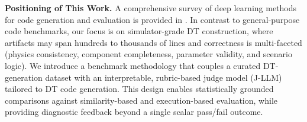 \noindent\textbf{Positioning of This Work.}
A comprehensive survey of deep learning methods for code generation and evaluation is provided in \cite{wu2022surveydeeplearningmodelscodes}.
In contrast to general-purpose code benchmarks, our focus is on simulator-grade DT construction, where artifacts may span hundreds to thousands of lines and correctness is multi-faceted (physics consistency, component completeness, parameter validity, and scenario logic).
We introduce a benchmark methodology that couples a curated DT-generation dataset with an interpretable, rubric-based judge model (J-LLM) tailored to DT code generation.
This design enables statistically grounded comparisons against similarity-based and execution-based evaluation, while providing diagnostic feedback beyond a single scalar pass/fail outcome.

